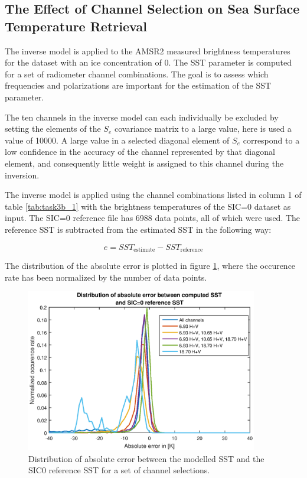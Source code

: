 \documentclass[11pt, a4paper]{article}
\begin{document}
\subsection{The Effect of Channel Selection on Sea Surface Temperature Retrieval}
The inverse model is applied to the AMSR2 measured brightness temperatures for the dataset with an ice concentration of 0. The SST parameter is computed for a set of radiometer channel combinations. The goal is to assess which frequencies and polarizations are important for the estimation of the SST parameter.
\newline

The ten channels in the inverse model can each individually be excluded by setting the elements of the \(S_e\) covariance matrix to a large value, here is used a value of 10000. A large value in a selected diagonal element of \(S_e\) correspond to a low confidence in the accuracy of the channel represented by that diagonal element, and consequently little weight is assigned to this channel during the inversion. 
\newline

The inverse model is applied using the channel combinations listed in column 1 of table \ref{tab:task3b_1} with the brightness temperatures of the SIC=0 dataset as input. The SIC=0 reference file has 6988 data points, all of which were used. The reference SST is subtracted from the estimated SST in the following way:

\begin{equation*}
e = SST_\text{estimate} - SST_\text{reference}
\end{equation*} 

The distribution of the absolute error is plotted in figure \ref{fig:task3b}, where the occurence rate has been normalized by the number of data points.   

\begin{figure}[h]
	\centering
	\includegraphics[width=0.9\textwidth]{task3b.eps}
	\caption{Distribution of absolute error between the modelled SST and the SIC0 reference SST for a set of channel selections.}
	\label{fig:task3b}
\end{figure}
\end{document}

